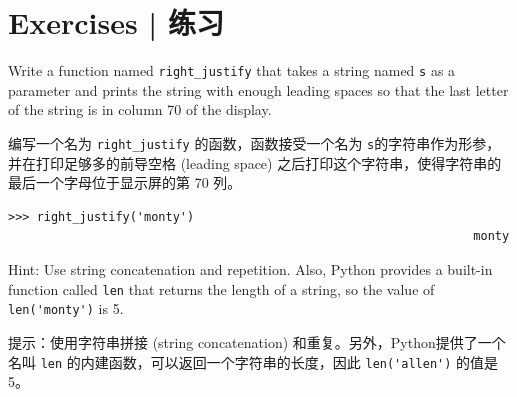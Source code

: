 %
\section{Exercises  |  练习}

\begin{exercise}

Write a function named \verb"right_justify" that takes a string
named {\tt s} as a parameter and prints the string with enough
leading spaces so that the last letter of the string is in column 70
of the display.

编写一个名为 \lstinline{right_justify} 的函数，函数接受一个名为 \lstinline{s}的字符串作为形参， 并在打印足够多的前导空格 (leading space) 之后打印这个字符串，使得字符串的最后一个字母位于显示屏的第 70 列。

\begin{lstlisting}
>>> right_justify('monty')
                                                                 monty
\end{lstlisting}

Hint: Use string concatenation and repetition.  Also,
Python provides a built-in function called {\tt len} that
returns the length of a string, so the value of \verb"len('monty')" is 5.

提示：使用字符串拼接 (string concatenation) 和重复。另外，Python提供了一个名叫 \lstinline{len} 的内建函数，可以返回一个字符串的长度，因此 \lstinline{len('allen')} 的值是5。

\end{exercise}


